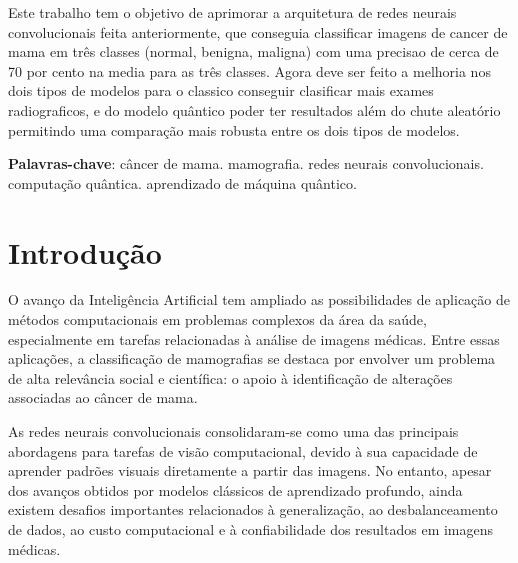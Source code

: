 \documentclass[
    12pt,
    openright,
    oneside,
    a4paper,
    english,
    brazil
]{abntex2}
\begin{document}
\frenchspacing

\pretextual
\imprimircapa
\imprimirfolhaderosto

\begin{resumo}

Este trabalho tem o objetivo de aprimorar a arquitetura de redes neurais convolucionais feita anteriormente, que conseguia classificar imagens de cancer de mama em três classes (normal, benigna, maligna) com uma precisao de cerca de 70 por cento na media para as três classes. Agora deve ser feito a melhoria nos dois tipos de modelos para o classico conseguir clasificar mais exames radiograficos, e do modelo quântico poder ter resultados além do chute aleatório permitindo uma comparação mais robusta entre os dois tipos de modelos. 

\vspace{\onelineskip}
\noindent
\textbf{Palavras-chave}: câncer de mama. mamografia. redes neurais convolucionais. computação quântica. aprendizado de máquina quântico.
\end{resumo}

\tableofcontents*
\cleardoublepage

\textual



\chapter{Introdução}

O avanço da Inteligência Artificial tem ampliado as possibilidades de aplicação de métodos computacionais em problemas complexos da área da saúde, especialmente em tarefas relacionadas à análise de imagens médicas. Entre essas aplicações, a classificação de mamografias se destaca por envolver um problema de alta relevância social e científica: o apoio à identificação de alterações associadas ao câncer de mama.

As redes neurais convolucionais consolidaram-se como uma das principais abordagens para tarefas de visão computacional, devido à sua capacidade de aprender padrões visuais diretamente a partir das imagens. No entanto, apesar dos avanços obtidos por modelos clássicos de aprendizado profundo, ainda existem desafios importantes relacionados à generalização, ao desbalanceamento de dados, ao custo computacional e à confiabilidade dos resultados em imagens médicas.
\end{document}
